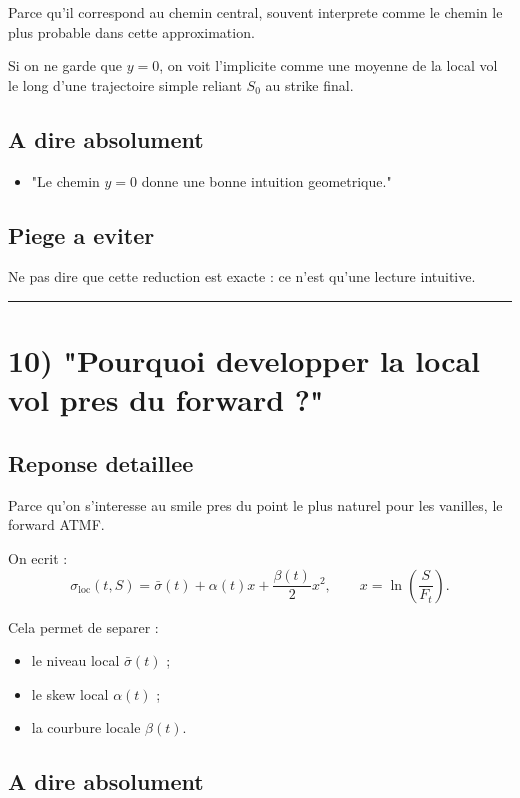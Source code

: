 \documentclass[11pt,a4paper]{article}
\begin{document}
Parce qu'il correspond au chemin central, souvent interprete comme le chemin le plus probable dans cette approximation.

Si on ne garde que \(y=0\), on voit l'implicite comme une moyenne de la local vol le long d'une trajectoire simple reliant \(S_0\) au strike final.

\subsection{A dire absolument}

\begin{itemize}
\item "Le chemin \(y=0\) donne une bonne intuition geometrique."
\end{itemize}

\subsection{Piege a eviter}

Ne pas dire que cette reduction est exacte : ce n'est qu'une lecture intuitive.

\bigskip\hrule\bigskip

\section{10) "Pourquoi developper la local vol pres du forward ?"}

\subsection{Reponse detaillee}

Parce qu'on s'interesse au smile pres du point le plus naturel pour les vanilles, le forward ATMF.

On ecrit :
\[
\sigma_{\mathrm{loc}}(t,S)=\bar{\sigma}(t)+\alpha(t)x+\frac{\beta(t)}{2}x^2,
\qquad
x=\ln\!\left(\frac{S}{F_t}\right).
\]

Cela permet de separer :

\begin{itemize}
\item le niveau local \(\bar{\sigma}(t)\) ;
\item le skew local \(\alpha(t)\) ;
\item la courbure locale \(\beta(t)\).
\end{itemize}

\subsection{A dire absolument}
\end{document}
